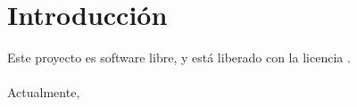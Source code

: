 \chapter{Introducción}




Este proyecto es software libre, y está liberado con la licencia \cite{gplv3}.
\\\\
Actualmente, 